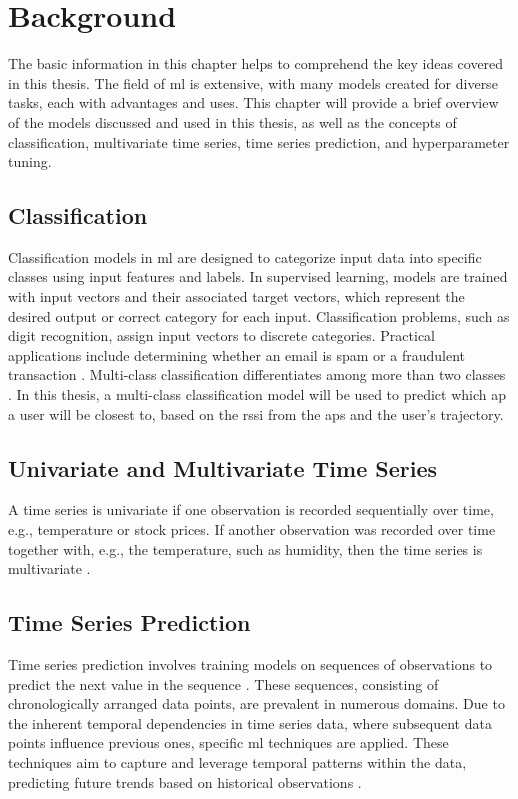 \chapter{Background}\label{ch:background}

The basic information in this chapter helps to comprehend the key ideas covered in this thesis.
The field of \ac{ml} is extensive, with many models created for diverse tasks, each with advantages and uses.
This chapter will provide a brief overview of the models discussed and used in this thesis, as well as the concepts of classification, multivariate time series, time series prediction, and hyperparameter tuning.

\section{Classification}

Classification models in \ac{ml} are designed to categorize input data into specific classes using input features and labels.
In supervised learning, models are trained with input vectors and their associated target vectors, which represent the desired output or correct category for each input.
Classification problems, such as digit recognition, assign input vectors to discrete categories.
Practical applications include determining whether an email is spam or a fraudulent transaction \cite{binary-classification}.
Multi-class classification differentiates among more than two classes \cite{BishopPatternRecognition}.
In this thesis, a multi-class classification model will be used to predict which \ac{ap} a user will be closest to, based on the \ac{rssi} from the \acp{ap} and the user's trajectory.


\section{Univariate and Multivariate Time Series}

A time series is univariate if one observation is recorded sequentially over time, e.g., temperature or stock prices.
If another observation was recorded over time together with, e.g., the temperature, such as humidity, then the time series is multivariate \cite{brownleeDeepLearningTime}.

\section{Time Series Prediction}

Time series prediction involves training models on sequences of observations to predict the next value in the sequence \cite{brownleeDeepLearningTime}.
These sequences, consisting of chronologically arranged data points, are prevalent in numerous domains.
Due to the inherent temporal dependencies in time series data, where subsequent data points influence previous ones, specific \ac{ml} techniques are applied.
These techniques aim to capture and leverage temporal patterns within the data, predicting future trends based on historical observations \cite{neptune-ai}.


